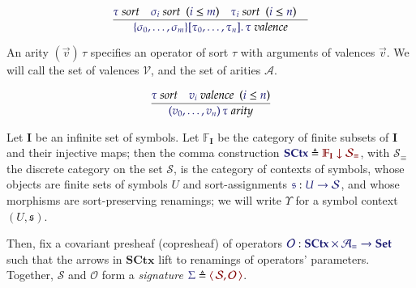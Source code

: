 \documentclass[11pt]{article}
\theoremstyle{definition}
\theoremstyle{remark}
\numberwithin{equation}{section}
\def\IModeColorName{MidnightBlue}
\def\OModeColorName{Maroon}
\newcommand\IMode[1]{{\color{\IModeColorName}{#1}}}
\newcommand\OMode[1]{{\color{\OModeColorName}{#1}}}
\newcommand\HypJ[2]{#1\ \ (#2)}
\newcommand\Of[2]{\IMode{#1}: \IMode{#2}}
\newcommand\MkValence[3]{%
  \ifthenelse{\equal{#1}{}}{}{%
    \{#1\}%
  }%
  \ifthenelse{\equal{#2}{}}{}{%
    [#2]%
  }.\, #3%
}
\newcommand\MkArity[2]{(#1)\, #2}
\newcommand\IsArity[1]{\IMode{#1}\ \textit{arity}}
\newcommand\IsValence[1]{\IMode{#1}\ \textit{valence}}
\newcommand\IsSort[1]{\IMode{#1}\ \textit{sort}}
\newcommand\Leq[2]{\IMode{#1}\leq\IMode{#2}}
\newcommand\Symbols{\mathbf{I}}
\newcommand\SymSets{\mathbb{F}_\Symbols}
\newcommand\Sorts{\mathcal{S}}
\newcommand\Valences{\mathcal{V}}
\newcommand\Arities{\mathcal{A}}
\newcommand\Operators{\mathcal{O}}
\newcommand\Discrete[1]{#1_{\equiv}}
\newcommand\Sets{\mathbf{Set}}
\newcommand\SCtx{\mathbf{SCtx}}
\newcommand\Pair[2]{\left\langle\,#1,#2\,\right\rangle}
\newcommand\Comma[2]{#1 \downarrow#2}
\newcommand\Define[2]{\IMode{#1}\triangleq\OMode{#2}}
\begin{document}
\[
  \infer{
    \IsValence{\MkValence{\sigma_0,\dots,\sigma_m}{\tau_0,\dots,\tau_n}{\tau}}
  }{
    \IsSort{\tau} &
    \HypJ{\IsSort{\sigma_i}}{\Leq{i}{m}} &
    \HypJ{\IsSort{\tau_i}}{\Leq{i}{n}} &
  }
\]

An arity $\MkArity{\vec{v}}{\tau}$ specifies an operator of sort $\tau$ with
arguments of valences $\vec{v}$. We will call the set of valences $\Valences$,
and the set of arities $\Arities$.

\[
  \infer{
    \IsArity{\MkArity{v_0,\ldots,v_n}{\tau}}
  }{
    \IsSort{\tau} &
    \HypJ{\IsValence{v_i}}{\Leq{i}{n}}
  }
\]


Let $\Symbols$ be an infinite set of symbols. Let $\SymSets$ be the category of
finite subsets of $\Symbols$ and their injective maps; then the comma
construction $\Define{\SCtx}{\Comma{\SymSets}{\Discrete{\Sorts}}}$, with
$\Discrete{\Sorts}$ the discrete category on the set $\mathcal{S}$, is the
category of contexts of symbols, whose objects are finite sets of symbols $U$
and sort-assignments $\Of{\mathfrak{s}}{U\to\Sorts}$, and whose morphisms are
sort-preserving renamings; we will write $\Upsilon$ for a symbol context
$(U,\mathfrak{s})$.

Then, fix a covariant presheaf (copresheaf) of operators
$\Of{\Operators}{\SCtx\times\Discrete{\Arities}\to\Sets}$ such that the arrows
in $\SCtx$ lift to renamings of operators' parameters. Together, $\Sorts$ and
$\Operators$ form a \emph{signature} $\Define{\Sigma}{\Pair{\Sorts}{\Operators}}$.
\end{document}
